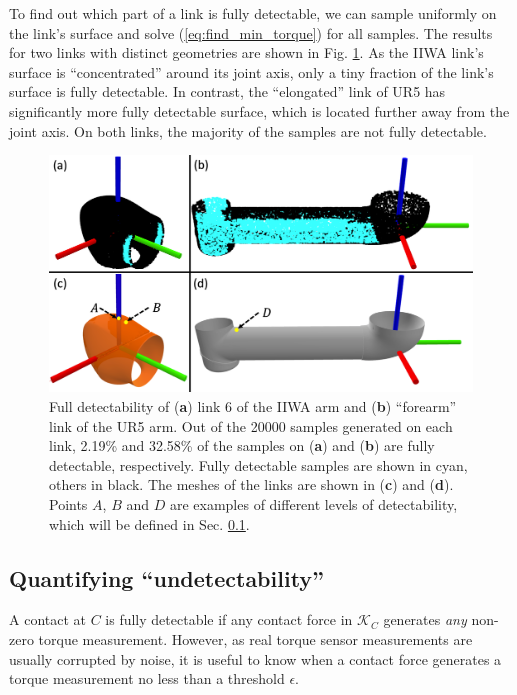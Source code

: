 To find out which part of a link is fully detectable, we can sample uniformly on the link's surface and solve (\ref{eq:find_min_torque}) for all samples. The results for two links with distinct geometries are shown in Fig. \ref{fig:full_observability}. As the IIWA link's surface is ``concentrated'' around its joint axis, only a tiny fraction of the link's surface is fully detectable. In contrast, the ``elongated'' link of UR5 has significantly more fully detectable surface, which is located further away from the joint axis. On both links, the majority of the samples are not fully detectable. 
\begin{figure}[h]
\vspace{-0.2cm}
\centering
\includegraphics[width=\linewidth]{figures/05_force_from_torque/full_observability.png}
\caption{Full detectability of (\textbf{a}) link 6 of the IIWA arm and (\textbf{b}) ``forearm'' link of the UR5 arm. Out of the 20000 samples generated on each link, 2.19\% and 32.58\% of the samples on (\textbf{a}) and (\textbf{b}) are fully detectable, respectively. Fully detectable samples are shown in cyan, others in black. The meshes of the links are shown in (\textbf{c}) and (\textbf{d}). Points $A$, $B$ and $D$ are examples of different levels of detectability, which will be defined in Sec. \ref{sec:undetectability}.}
\label{fig:full_observability}
\vspace{-0.5cm}
\end{figure}

\subsection{Quantifying ``undetectability''} \label{sec:undetectability}
A contact at $C$ is fully detectable if any contact force in $\mathcal{K}_C$ generates \textit{any} non-zero torque measurement. However, as real torque sensor measurements are usually corrupted by noise, it is useful to know when a contact force generates a torque measurement no less than a threshold $\epsilon$.

